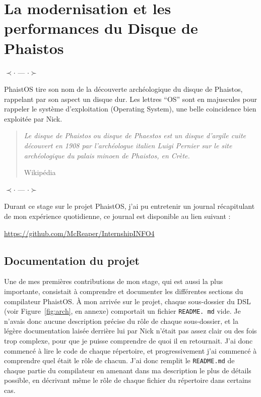 \section{La modernisation et les performances du Disque de Phaistos}
\label{contrib}

\begin{center}
    $\prec \cdot$ --- $\cdot \succ$ 
\end{center}

PhaistOS tire son nom de la découverte archéologique du disque de Phaistos, 
rappelant par son aspect un disque dur. Les lettres ``OS'' sont en majuscules 
pour rappeler le système d'exploitation (Operating System), une belle 
coincidence bien exploitée par Nick. 

\blockquote[Wikipédia][--]{\textit{Le disque de Phaistos ou disque de Phaestos 
est un disque d'argile cuite découvert en 1908 par l'archéologue italien Luigi 
Pernier sur le site archéologique du palais minoen de Phaistos, en Crète.}
}

\begin{center}
    $\prec \cdot$ --- $\cdot \succ$ 
\end{center}

Durant ce stage sur le projet PhaistOS, j'ai pu entretenir un journal 
récapitulant de mon expérience quotidienne, ce journal est disponible au lien 
suivant :

\begin{center}
\href{https://github.com/McReaper/InternshipINFO4}{https://github.com/McReaper/InternshipINFO4}
\end{center}

\subsection{Documentation du projet}

Une de mes premières contributions de mon stage, qui est aussi la plus 
importante, consistait à comprendre et documenter les différentes sections du 
compilateur PhaistOS. À mon arrivée sur le projet, chaque sous-dossier du DSL 
(voir Figure~\ref{fig:arch}, en annexe) comportait un fichier \texttt{README.
md} vide. Je n'avais donc aucune description précise du rôle de chaque 
sous-dossier, et la légère documentation laisée derrière lui par Nick n'était 
pas assez clair ou des fois trop complexe, pour que je puisse comprendre de 
quoi il en retournait. J'ai donc commencé à lire le code de chaque répertoire, 
et progressivement j'ai commencé à comprendre quel était le rôle de chacun. 
J'ai donc remplit le \texttt{README.md} de chaque partie du compilateur en 
amenant dans ma description le plus de détails possible, en décrivant même le 
rôle de chaque fichier du répertoire dans certains cas. 

